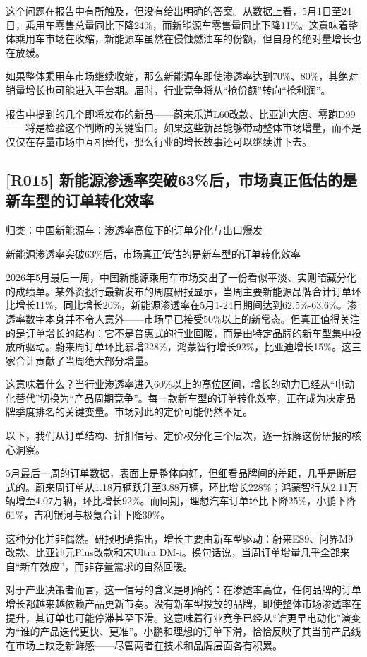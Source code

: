 \documentclass[11pt]{ctexart}
\begin{document}
这个问题在报告中有所触及，但没有给出明确的答案。从数据上看，5月1日至24日，乘用车零售总量同比下降24\%，而新能源车零售量同比下降11\%。这意味着整体乘用车市场在收缩，新能源车虽然在侵蚀燃油车的份额，但自身的绝对量增长也在放缓。

如果整体乘用车市场继续收缩，那么新能源车即使渗透率达到70\%、80\%，其绝对销量增长也可能进入平台期。届时，行业竞争将从“抢份额”转向“抢利润”。

报告中提到的几个即将发布的新品——蔚来乐道L60改款、比亚迪大唐、零跑D99——将是检验这个判断的关键窗口。如果这些新品能够带动整体市场增量，而不是仅仅在存量市场中互相替代，那么行业的增长故事还可以继续讲下去。

\subsection{[R015] 新能源渗透率突破63\%后，市场真正低估的是新车型的订单转化效率}
{\small\color{refgray}归类：中国新能源车：渗透率高位下的订单分化与出口爆发}

新能源渗透率突破63\%后，市场真正低估的是新车型的订单转化效率

2026年5月最后一周，中国新能源乘用车市场交出了一份看似平淡、实则暗藏分化的成绩单。某外资投行最新发布的周度研报显示，当周主要新能源品牌合计订单环比增长11\%，同比增长20\%，新能源渗透率在5月1-24日期间达到62.5\%-63.6\%。渗透率数字本身并不令人意外——市场早已接受50\%以上的新常态。但真正值得关注的是订单增长的结构：它不是普惠式的行业回暖，而是由特定品牌的新车型集中投放所驱动。蔚来周订单环比暴增228\%，鸿蒙智行增长92\%，比亚迪增长15\%。这三家合计贡献了当周绝大部分增量。

这意味着什么？当行业渗透率进入60\%以上的高位区间，增长的动力已经从“电动化替代”切换为“产品周期竞争”。每一款新车型的订单转化效率，正在成为决定品牌季度排名的关键变量。市场对此的定价可能仍然不足。

以下，我们从订单结构、折扣信号、定价权分化三个层次，逐一拆解这份研报的核心洞察。

5月最后一周的订单数据，表面上是整体向好，但细看品牌间的差距，几乎是断层式的。蔚来周订单从1.18万辆跃升至3.88万辆，环比增长228\%；鸿蒙智行从2.11万辆增至4.07万辆，环比增长92\%。而同期，理想汽车订单环比下降25\%，小鹏下降61\%，吉利银河与极氪合计下降39\%。

这种分化并非偶然。研报明确指出，增长主要由新车型驱动：蔚来ES9、问界M9改款、比亚迪元Plus改款和宋Ultra DM-i。换句话说，当周订单增量几乎全部来自“新车效应”，而非存量需求的自然回暖。

对于产业决策者而言，这一信号的含义是明确的：在渗透率高位，任何品牌的订单增长都越来越依赖产品更新节奏。没有新车型投放的品牌，即使整体市场渗透率在提升，其订单也可能停滞甚至下滑。这意味着行业竞争已经从“谁更早电动化”演变为“谁的产品迭代更快、更准”。小鹏和理想的订单下滑，恰恰反映了其当前产品线在市场上缺乏新鲜感——尽管两者在技术和品牌层面各有积累。
\end{document}
